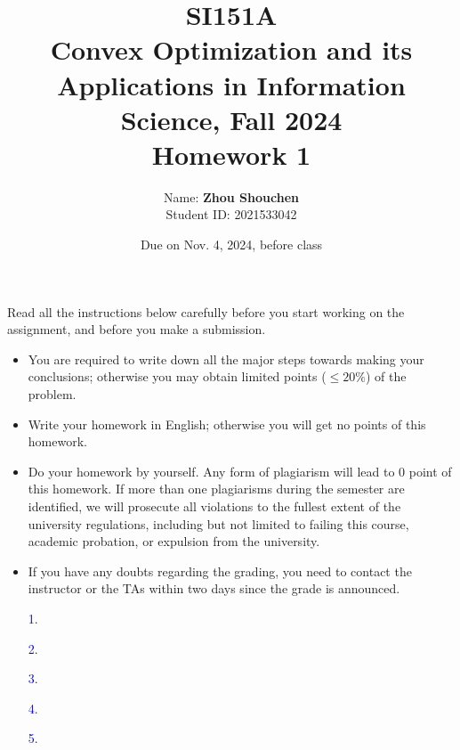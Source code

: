 \documentclass[10pt]{article}
\begin{document}
\date{
Due on Nov. 4, 2024, before class}
\title{SI151A \\ Convex Optimization and its Applications in Information Science, Fall 2024 \\
Homework 1}
\author{
    Name: \textbf{Zhou Shouchen} \\
	Student ID: 2021533042
}
\maketitle

Read all the instructions below carefully before you start working on the assignment, and before you make a submission.

\begin{itemize}
    \item You are required to write down all the major steps towards making your conclusions; otherwise you may obtain limited points ($\leq 20\%$) of the problem.
    \item Write your homework in English; otherwise you will get no points of this homework.
    \item Do your homework by yourself. Any form of plagiarism will lead to $0$ point of this homework. If more than one plagiarisms during the semester are identified, we will prosecute all violations to the fullest extent of the university regulations, including but not limited to failing this course, academic probation, or expulsion from the university.
    \item If you have any doubts regarding the grading, you need to contact the instructor or the TAs within two days since the grade is announced.
\end{itemize}

\newpage

\begin{itemize}

\item[\textcolor{blue}{1}.]


\item[\textcolor{blue}{2}.]


\item[\textcolor{blue}{3}.]


\item[\textcolor{blue}{4}.]


\item[\textcolor{blue}{5}.]


\end{itemize}
\end{document}
